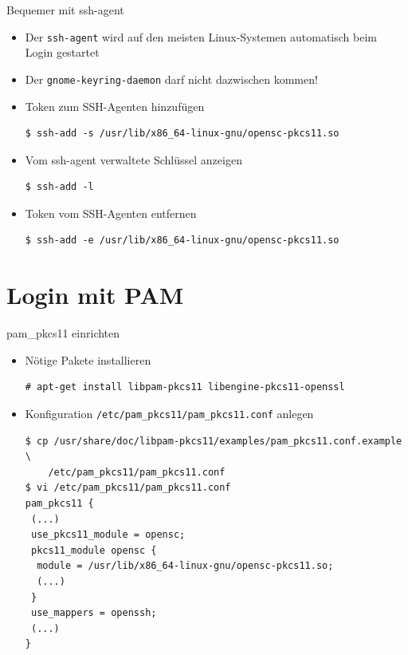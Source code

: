 \documentclass{beamer}
\begin{document}
\begin{frame}[fragile]{Bequemer mit ssh-agent}
\begin{minipage}[t][\textheight][t]{\linewidth}
\begin{itemize}
  \item Der \lstinline|ssh-agent| wird auf den meisten Linux-Systemen
  automatisch beim Login gestartet
  \item Der \lstinline|gnome-keyring-daemon| darf nicht dazwischen kommen!
  \item Token zum SSH-Agenten hinzufügen
  \begin{lstlisting}
$ ssh-add -s /usr/lib/x86_64-linux-gnu/opensc-pkcs11.so
  \end{lstlisting}
  \item Vom ssh-agent verwaltete Schlüssel anzeigen
  \begin{lstlisting}
$ ssh-add -l
  \end{lstlisting}
  \item Token vom SSH-Agenten entfernen
  \begin{lstlisting}
$ ssh-add -e /usr/lib/x86_64-linux-gnu/opensc-pkcs11.so
  \end{lstlisting}
\end{itemize}
\end{minipage}
\end{frame}

\section{Login mit PAM}

\begin{frame}[fragile]{pam\_pkcs11 einrichten}
\begin{minipage}[t][\textheight][t]{\linewidth}
\begin{itemize}
	\item Nötige Pakete installieren
	\begin{lstlisting}
# apt-get install libpam-pkcs11 libengine-pkcs11-openssl
	\end{lstlisting}
   \item Konfiguration \lstinline|/etc/pam_pkcs11/pam_pkcs11.conf| anlegen
\begin{lstlisting}[basicstyle=\tiny\tt]
$ cp /usr/share/doc/libpam-pkcs11/examples/pam_pkcs11.conf.example \
    /etc/pam_pkcs11/pam_pkcs11.conf
$ vi /etc/pam_pkcs11/pam_pkcs11.conf
pam_pkcs11 {
 (...)
 use_pkcs11_module = opensc;
 pkcs11_module opensc {
  module = /usr/lib/x86_64-linux-gnu/opensc-pkcs11.so;
  (...)
 }
 use_mappers = openssh;
 (...)
}
\end{lstlisting}
\end{itemize}
\end{minipage}
\end{frame}
\end{document}
